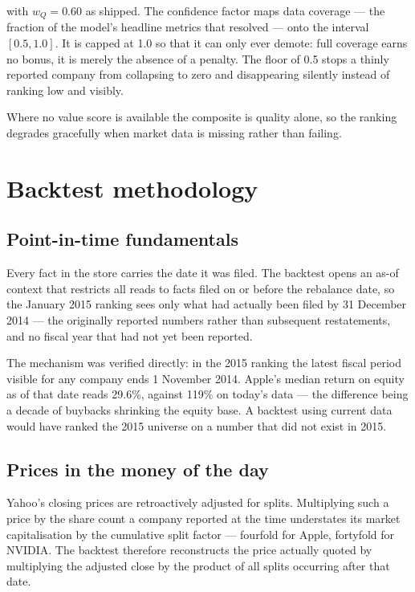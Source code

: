 \documentclass[11pt,a4paper]{article}
\begin{document}
with $w_Q = 0.60$ as shipped. The confidence factor maps data coverage --- the
fraction of the model's headline metrics that resolved --- onto the interval
$[0.5, 1.0]$. It is capped at 1.0 so that it can only ever demote: full
coverage earns no bonus, it is merely the absence of a penalty. The floor
of 0.5 stops a thinly reported company from collapsing to zero and disappearing
silently instead of ranking low and visibly.

Where no value score is available the composite is quality alone, so the
ranking degrades gracefully when market data is missing rather than failing.

\section{Backtest methodology}

\subsection{Point-in-time fundamentals}

Every fact in the store carries the date it was filed. The backtest opens an
as-of context that restricts all reads to facts filed on or before the
rebalance date, so the January 2015 ranking sees only what had actually been
filed by 31 December 2014 --- the originally reported numbers rather than
subsequent restatements, and no fiscal year that had not yet been reported.

The mechanism was verified directly: in the 2015 ranking the latest fiscal
period visible for any company ends 1 November 2014. Apple's median return on
equity as of that date reads 29.6\%, against 119\% on today's data --- the
difference being a decade of buybacks shrinking the equity base. A backtest
using current data would have ranked the 2015 universe on a number that did not
exist in 2015.

\subsection{Prices in the money of the day}

Yahoo's closing prices are retroactively adjusted for splits. Multiplying such
a price by the share count a company reported at the time understates its
market capitalisation by the cumulative split factor --- fourfold for Apple,
fortyfold for NVIDIA. The backtest therefore reconstructs the price actually
quoted by multiplying the adjusted close by the product of all splits occurring
after that date.
\end{document}
